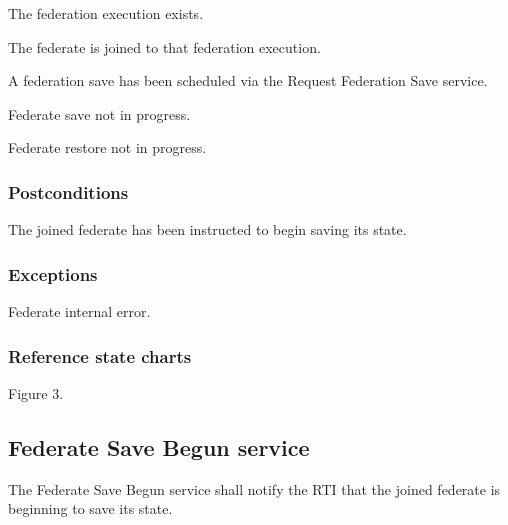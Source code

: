 \begin{stdalphalist}
    \item The federation execution exists.
    \item The federate is joined to that federation execution.
    \item A federation save has been scheduled via the Request Federation Save service.
    \item Federate save not in progress.
    \item Federate restore not in progress.
\end{stdalphalist}

\clearpage


\subsubsection{Postconditions}

\begin{stdalphalist}
    \item The joined federate has been instructed to begin saving its state.
\end{stdalphalist}

\subsubsection{Exceptions}

\begin{stdalphalist}
    \item Federate internal error.
\end{stdalphalist}

\subsubsection{Reference state charts}

\begin{stdalphalist}
    \item Figure 3.
\end{stdalphalist}

\subsection{Federate Save Begun service}

The Federate Save Begun service shall notify the RTI that the joined federate is beginning to save its state.

